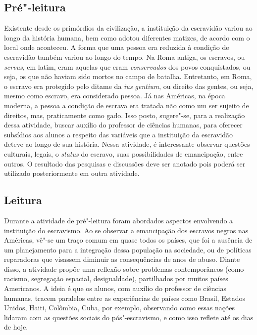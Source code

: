 \documentclass[12pt]{extarticle}
\begin{document}

\subsection{Pré"-leitura}

Existente desde os primórdios da civilização, a instituição
da escravidão variou ao longo da história humana, bem como adotou
diferentes matizes, de acordo com o local onde aconteceu. A forma que
uma pessoa era reduzida à condição de escravidão também variou ao longo
do tempo. Na Roma antiga, os escravos, ou \emph{servus}, em latim, eram
aquelas que eram \emph{conservados} dos povos conquistados, ou seja, os
que não haviam sido mortos no campo de batalha. Entretanto, em Roma, o
escravo era protegido pelo ditame da \emph{ius gentium}, ou direito das
gentes, ou seja, mesmo como escravo, era considerado pessoa. Já nas
Américas, na época moderna, a pessoa a condição de escrava era tratada
não como um ser sujeito de direitos, mas, praticamente como gado. Isso
posto, sugere"-se, para a realização dessa atividade, buscar auxílio do
professor de ciências humanas, para oferecer subsídios aos alunos a
respeito das variáveis que a instituição da escravidão deteve ao longo
de sua história. Nessa atividade, é interessante observar questões
culturais, legais, o \emph{status} do escravo, suas possibilidades de
emancipação, entre outros. O resultado das pesquisas e discussões deve
ser anotado pois poderá ser utilizado posteriormente em outra atividade.

\subsection{Leitura}

Durante a atividade de pré"-leitura foram abordados aspectos
envolvendo a instituição do escravismo. Ao se observar a emancipação dos
escravos negros nas Américas, vê"-se um traço comum em quase todos os
países, que foi a ausência de um planejamento para a integração dessa
população na sociedade, ou de políticas reparadoras que visassem
diminuir as consequências de anos de abuso. Diante disso, a atividade
propõe uma reflexão sobre problemas contemporâneos (como racismo,
segregação espacial, desigualdade), partilhados por muitos países
Americanos. A ideia é que os alunos, com auxílio do professor de
ciências humanas, tracem paralelos entre as experiências de países como
Brasil, Estados Unidos, Haiti, Colômbia, Cuba, por exemplo, observando
como essas nações lidaram com as questões sociais do pós"-escravismo, e
como isso reflete até os dias de hoje.
\end{document}
